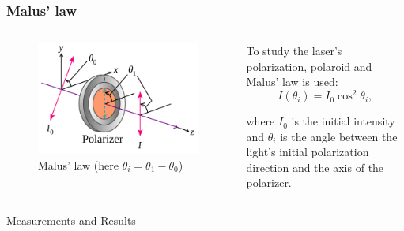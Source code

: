 \documentclass{beamer}
\begin{document}
	\begin{frame}
		\frametitle{Malus' law}
		\begin{columns}
		\begin{column}{0.4\textwidth}
			\begin{figure}
				\centering
				\includegraphics[width=1\linewidth]{res/malus_law.png}
				\caption{Malus' law (here $\theta_i = \theta_1 - \theta_0$)}
			\end{figure}
		\end{column}
		\begin{column}{0.6\textwidth}
			 To study the laser's polarization, polaroid and Malus' law is used:
			 \begin{equation}
				 I(\theta_i) = I_0 \cos^2{\theta_i},
				 \label{eq:malus}
			 \end{equation}
			 
			 where $I_0$ is the initial intensity and $\theta_i$ is the angle between the light's initial polarization direction and the axis of the polarizer.
			 
		\end{column}
		\end{columns}	
	\end{frame}


	\begin{frame}[plain,c]
		
		\begin{center}
			\huge {} Measurements and Results
		\end{center}
		
	\end{frame}
	
\end{document}
